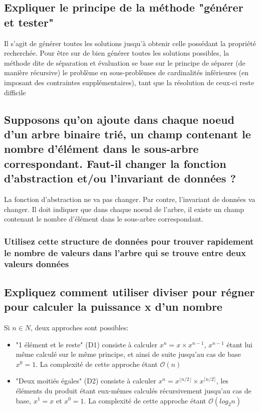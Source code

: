 \documentclass[11pt]{article}
\begin{document}
\subsection{Expliquer le principe de la méthode "générer et tester"}

Il s’agit de générer toutes les solutions jusqu’à obtenir celle possédant la propriété recherchée. Pour être sur de bien générer toutes les solutions possibles, la méthode dite de séparation et évaluation se base sur le principe de séparer (de manière récursive) le problème en sous-problèmes de cardinalités inférieures (en imposant des contraintes supplémentaires), tant que la résolution de ceux-ci reste difficile

\subsection{Supposons qu'on ajoute dans chaque noeud d'un arbre binaire trié, un champ contenant le nombre d'élément dans le sous-arbre correspondant. Faut-il changer la fonction d'abstraction et/ou l'invariant de données ?}

La fonction d'abstraction ne va pas changer. Par contre, l'invariant de données va changer. Il doit indiquer que dans chaque noeud de l'arbre, il existe un champ contenant le nombre d'élément dans le sous-arbre correspondant.

\subsubsection{Utilisez cette structure de données pour trouver rapidement le nombre de valeurs dans l'arbre qui se trouve entre deux valeurs données}

\subsection{Expliquez comment utiliser diviser pour régner pour calculer la puissance x d'un nombre}

Si $n \in N$, deux approches sont possibles:

\begin{itemize}
	\item "1 élément et le reste" (D1) consiste à calculer $x^n = x \times x^{n-1}$, $x^{n-1}$ étant lui même calculé sur le même principe, et ainsi de suite jusqu'au cas de base $x^0 = 1$. La complexité de cette approche étant $\mathcal{O}(n)$
	\item "Deux moitiés égales" (D2) consiste à calculer $x^n = x^{\lfloor n/2\rfloor} \times x^{\lceil n/2 \rceil}$, les éléments du produit étant eux-mêmes calculés récursivement jusqu'au cas de base, $x^1 = x$ et $x^0 = 1$. La complexité de cette approche étant $\mathcal{O}(log_2{n})$
\end{itemize}
\end{document}
